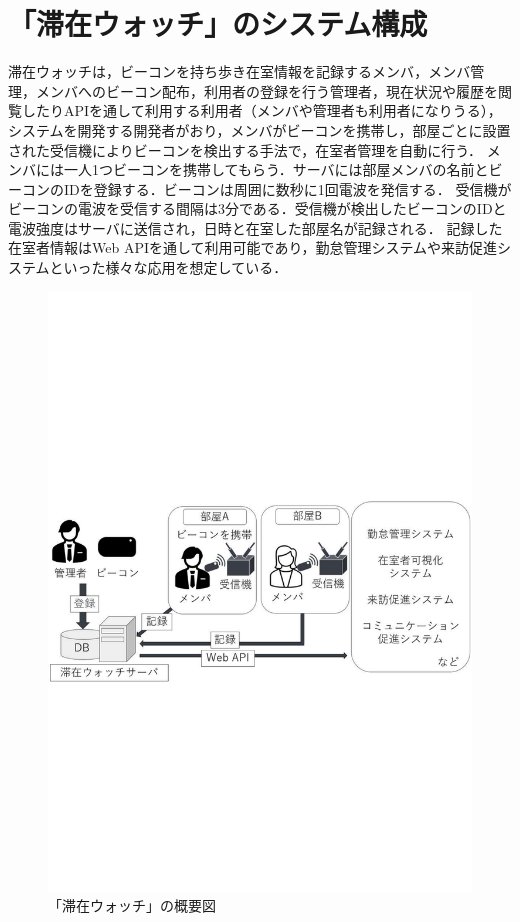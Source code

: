 

\section{「滞在ウォッチ」のシステム構成}\label{3.1}
滞在ウォッチは，ビーコンを持ち歩き在室情報を記録するメンバ，メンバ管理，メンバへのビーコン配布，利用者の登録を行う管理者，現在状況や履歴を閲覧したりAPIを通して利用する利用者（メンバや管理者も利用者になりうる），システムを開発する開発者がおり，メンバがビーコンを携帯し，部屋ごとに設置された受信機によりビーコンを検出する手法で，在室者管理を自動に行う．
メンバには一人1つビーコンを携帯してもらう．サーバには部屋メンバの名前とビーコンのIDを登録する．ビーコンは周囲に数秒に1回電波を発信する．
受信機がビーコンの電波を受信する間隔は3分である．受信機が検出したビーコンのIDと電波強度はサーバに送信され，日時と在室した部屋名が記録される．
記録した在室者情報はWeb APIを通して利用可能であり，勤怠管理システムや来訪促進システムといった様々な応用を想定している．

\begin{figure}[h]
  \centering  %
  \includegraphics[clip,scale = 0.6]{image/system.pdf}
  \caption{「滞在ウォッチ」の概要図}    \label{StayWatchOverview}
\end{figure}

